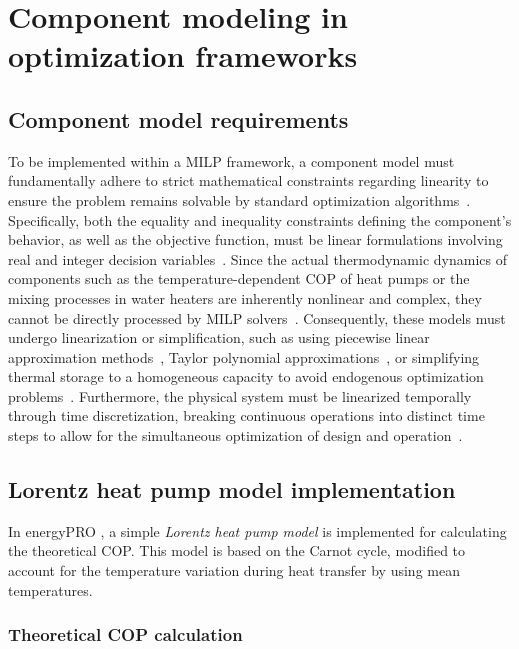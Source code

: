 \documentclass[11pt,a4paper]{report}
\begin{document}
\section{Component modeling in optimization frameworks}
\label{sec:comp_modeling_methods}
\subsection{Component model requirements}
To be implemented within a MILP framework, a component model must fundamentally adhere to strict mathematical constraints regarding linearity to ensure the problem remains solvable by standard optimization algorithms~\cite{Krutzfeldt2021}.
Specifically, both the equality and inequality constraints defining the component's behavior, as well as the objective function, must be linear formulations involving real and integer decision variables~\cite{Wu2019}.
Since the actual thermodynamic dynamics of components such as the temperature-dependent COP of heat pumps or the mixing processes in water heaters are inherently nonlinear and complex, they cannot be directly processed by MILP solvers~\cite{Wu2019, Krutzfeldt2021}.
Consequently, these models must undergo linearization or simplification, such as using piecewise linear approximation methods~\cite{Wu2019}, Taylor polynomial approximations~\cite{Krutzfeldt2021}, or simplifying thermal storage to a homogeneous capacity to avoid endogenous optimization problems~\cite{Steen2015}.
Furthermore, the physical system must be linearized temporally through time discretization, breaking continuous operations into distinct time steps to allow for the simultaneous optimization of design and operation~\cite{Krutzfeldt2021}.

\subsection{Lorentz heat pump model implementation} %
\label{sub:lorentz_model}

In energyPRO \cite{EMD_COP_HeatCapacity}, a simple \emph{Lorentz heat pump model} is implemented for calculating the theoretical COP. This model is based on the Carnot cycle, modified to account for the temperature variation during heat transfer by using mean temperatures.

\subsubsection{Theoretical COP calculation} %
\end{document}
